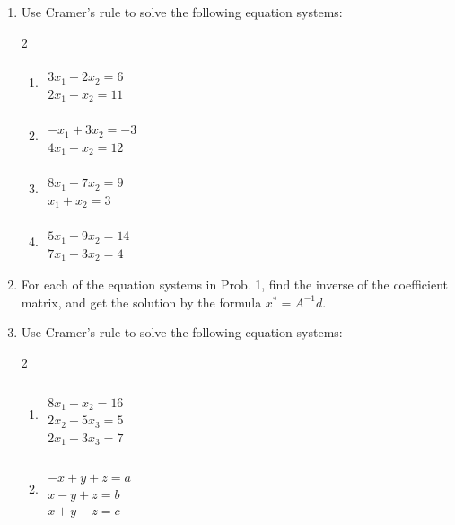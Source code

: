 \begin{enumerate}

\item[1.] Use Cramer's rule to solve the following equation systems:
\vspace{-0.75cm}
\begin{multicols}{2}
\begin{enumerate}
\item [(a)] $\begin{aligned} \\
	3x_1-2x_2 = 6 \\
	2x_1 + x_2 =11
\end{aligned}$  \vspace{-0.75cm}
\item [(b)] $\begin{aligned} \\
	-x_1+3x_2 =-3 \\
	4x_1-x_2 = 12 
\end{aligned}$ \vspace{-0.75cm}
\item [(c)] $\begin{aligned} \\
	8x_1-7x_2 =9 \\
	x_1 + x_2 = 3
\end{aligned}$ \vspace{-0.75cm}
\item [(d)] $\begin{aligned} \\
	5x_1 + 9x_2 = 14 \\
	7 x_1-3x_2 = 4
\end{aligned}$
\end{enumerate}
\end{multicols} 

\item[2.] For each of the equation systems in Prob. 1, find the inverse of the coefficient matrix, and get the solution by the formula $x^{*}=A^{-1} d$.

\item[3.] Use Cramer's rule to solve the following equation systems:
\vspace{-1.25cm}
\begin{multicols}{2}
\begin{enumerate}
\item [(a)] $\begin{aligned} \\~\\
	8 x_{1}-x_{2}=16 \\
	2x_2 + 5 x_3 = 5 \\
	2x_1 + 3x_3 = 7
\end{aligned}$  \vspace{-1.25cm}
\item [(d)] $\begin{aligned} \\~\\
	-x + y+z = a \\
	x-y + z = b \\
	x+y-z = c
\end{aligned}$
\end{enumerate}
\end{multicols} 

\end{enumerate}
